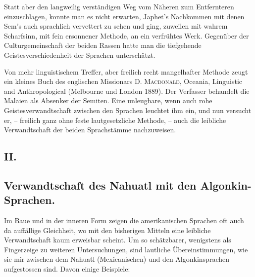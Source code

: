 
Statt aber den langweilig verständigen Weg vom Näheren zum Entfernteren einzuschlagen, konnte man es nicht erwarten, Japhet’s Nachkommen mit denen Sem’s auch sprachlich vervettert zu sehen und ging, zuweilen mit wahrem Scharfsinn, mit fein ersonnener Methode, an ein verfrühtes Werk. Gegenüber der Culturgemeinschaft der beiden Rassen hatte man die tiefgehende Geistesverschiedenheit der Sprachen unterschätzt.

Von mehr linguistischem Treffer, aber freilich recht mangelhafter Methode zeugt ein kleines Buch des englischen Missionars \textsc{D. Macdonald}, Oceania, Linguistic and Anthropological (Melbourne und London 1889). Der Verfasser behandelt die Malaien als Absenker der Semiten. Eine unleugbare, wenn auch rohe Geistesverwandtschaft zwischen den Sprachen \label{fp.173} leuchtet ihm ein, und nun versucht er, – freilich ganz ohne feste lautgesetzliche Methode, – auch die leibliche Verwandtschaft der beiden Sprachstämme nachzuweisen.

\subsection*{II.}\label{III.I.I.4.II}
\subsection*{Verwandtschaft des Nahuatl mit den Algonkin-Sprachen.}
Im Baue und in der inneren Form zeigen die amerikanischen Sprachen oft auch da auffällige Gleichheit, wo mit den bisherigen Mitteln eine leibliche Verwandtschaft kaum erweisbar scheint. Um so schätzbarer, wenigstens als Fingerzeige zu weiteren Untersuchungen, sind lautliche Übereinstimmungen, wie sie mir zwischen dem Nahuatl (Mexicanischen) und den Algonkinsprachen aufgestossen sind. Davon einige Beispiele:

